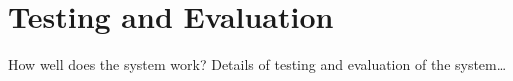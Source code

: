 \section{Testing and Evaluation}\label{testing}
How well does the system work? Details of testing and evaluation of the system\ldots


